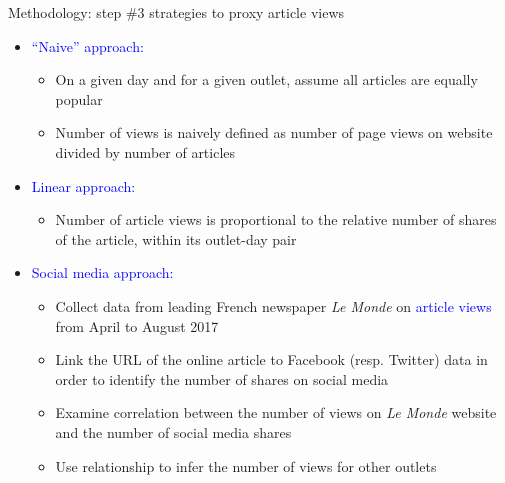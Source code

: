 \documentclass[english]{beamer}
\begin{document}
\begin{frame}{Methodology: step \#3 strategies to proxy article views}
    \begin{itemize}
    \setlength{\itemsep}{0.8em}
        \item \textcolor{blue}{``Naive'' approach:}
        \begin{itemize}
        \setlength{\itemsep}{0.3em}
            \item On a given day and for a given outlet, assume all articles are equally popular
            \item Number of views is naively defined as number of page views on website divided by number of articles
        \end{itemize}
        \pause
        \item \textcolor{blue}{Linear approach:}
        \begin{itemize}
        \setlength{\itemsep}{0.3em}
            \item Number of article views is proportional to the relative number of shares of the article, within its outlet-day pair
        \end{itemize}
                \pause
        \item \textcolor{blue}{Social media approach:}
        \begin{itemize}
        \setlength{\itemsep}{0.3em}
            \item Collect data from leading French newspaper \textit{Le Monde} on \textcolor{blue}{article views} from April to August 2017
        \item Link the URL of the online article to Facebook (resp. Twitter) data in order to identify the number of shares on social media
        \item Examine correlation between the number of views on \textit{Le Monde} website and the number of social media shares
        \item Use relationship to infer the number of views for other outlets
        \end{itemize}
    \end{itemize}
\end{frame}
\end{document}
